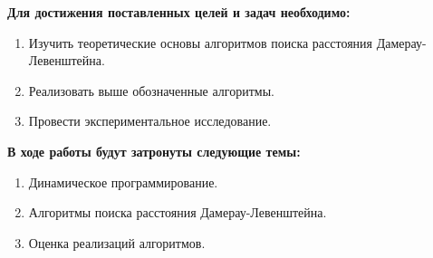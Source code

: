 \textbf{Для достижения поставленных целей и задач необходимо:}
\begin{enumerate}
    \item Изучить теоретические основы алгоритмов поиска расстояния Дамерау-Левенштейна.
    \item Реализовать выше обозначенные алгоритмы.
    \item Провести экспериментальное исследование.
\end{enumerate}

\textbf{В ходе работы будут затронуты следующие темы:}
\begin{enumerate}
\item Динамическое программирование.
\item Алгоритмы поиска расстояния Дамерау-Левенштейна.
\item Оценка реализаций алгоритмов.
\end{enumerate}
